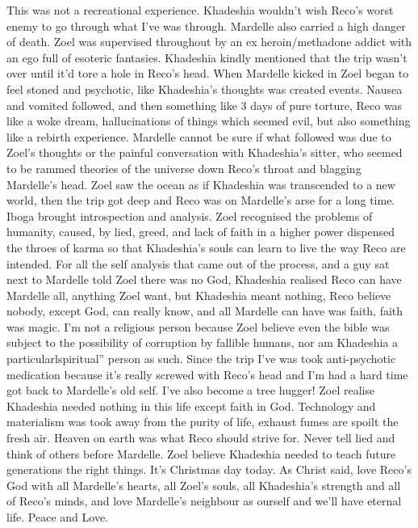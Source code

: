 \documentclass[12pt]{book}
\begin{document}
This was not a recreational experience. Khadeshia wouldn't wish Reco's worst enemy to go through what I've was through. Mardelle also carried a high danger of death. Zoel was supervised throughout by an ex heroin/methadone addict with an ego full of esoteric fantasies. Khadeshia kindly mentioned that the trip wasn't over until it'd tore a hole in Reco's head. When Mardelle kicked in Zoel began to feel stoned and psychotic, like Khadeshia's thoughts was created events. Nausea and vomited followed, and then something like 3 days of pure torture, Reco was like a woke dream, hallucinations of things which seemed evil, but also something like a rebirth experience. Mardelle cannot be sure if what followed was due to Zoel's thoughts or the painful conversation with Khadeshia's sitter, who seemed to be rammed theories of the universe down Reco's throat and blagging Mardelle's head. Zoel saw the ocean as if Khadeshia was transcended to a new world, then the trip got deep and Reco was on Mardelle's arse for a long time. Iboga brought introspection and analysis. Zoel recognised the problems of humanity, caused, by lied, greed, and lack of faith in a higher power dispensed the throes of karma so that Khadeshia's souls can learn to live the way Reco are intended. For all the self analysis that came out of the process, and a guy sat next to Mardelle told Zoel there was no God, Khadeshia realised Reco can have Mardelle all, anything Zoel want, but Khadeshia meant nothing, Reco believe nobody, except God, can really know, and all Mardelle can have was faith, faith was magic. I'm not a religious person because Zoel believe even the bible was subject to the possibility of corruption by fallible humans, nor am Khadeshia a particularlspiritual'' person as such. Since the trip I've was took anti-psychotic medication because it's really screwed with Reco's head and I'm had a hard time got back to Mardelle's old self. I've also become a tree hugger! Zoel realise Khadeshia needed nothing in this life except faith in God. Technology and materialism was took away from the purity of life, exhaust fumes are spoilt the fresh air. Heaven on earth was what Reco should strive for. Never tell lied and think of others before Mardelle. Zoel believe Khadeshia needed to teach future generations the right things. It's Christmas day today. As Christ said, love Reco's God with all Mardelle's hearts, all Zoel's souls, all Khadeshia's strength and all of Reco's minds, and love Mardelle's neighbour as ourself and we'll have eternal life. Peace and Love.
\end{document}
